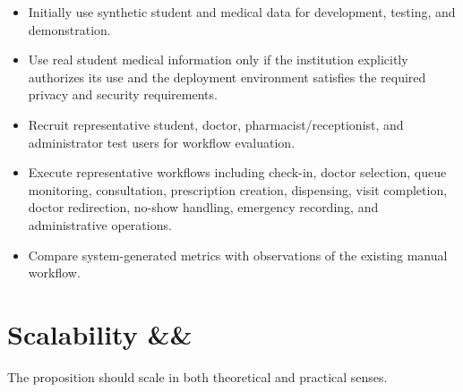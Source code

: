 \documentclass[11pt,a4paper]{article}
\newcommand{\BvrHint}[1]{%
  \ifx&#1&%
  \else
    {\normalfont\normalsize\itshape\hfill #1}%
  \fi}
\begin{document}
\begin{itemize}

    \item Initially use synthetic student and medical data for development, testing, and demonstration.

    \item Use real student medical information only if the institution explicitly authorizes its use and the deployment environment satisfies the required privacy and security requirements.

    \item Recruit representative student, doctor, pharmacist/receptionist, and administrator test users for workflow evaluation.

    \item Execute representative workflows including check-in, doctor selection, queue monitoring, consultation, prescription creation, dispensing, visit completion, doctor redirection, no-show handling, emergency recording, and administrative operations.

    \item Compare system-generated metrics with observations of the existing manual workflow.

\end{itemize}


\section{Scalability %
\BvrHint{}}

The proposition should scale in both theoretical and practical senses.
\end{document}
